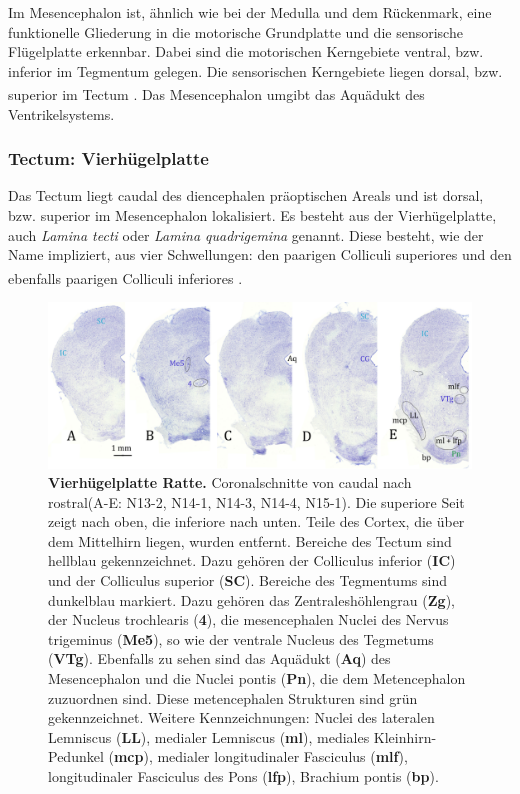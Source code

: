 \documentclass[12pt,a4paper,pdftex]{article}
\begin{document}
Im Mesencephalon ist, ähnlich wie bei der Medulla und dem Rückenmark, eine funktionelle Gliederung in die motorische Grundplatte und die sensorische Flügelplatte erkennbar. Dabei sind die motorischen Kerngebiete ventral, bzw. inferior im Tegmentum gelegen. Die sensorischen Kerngebiete liegen dorsal, bzw. superior im Tectum \textsuperscript{\cite[6]{trepel2011neuroanatomie}}. Das Mesencephalon umgibt das Aquädukt des Ventrikelsystems.

\subsubsection{Tectum: Vierhügelplatte}
 

Das Tectum liegt caudal des diencephalen präoptischen Areals und ist dorsal, bzw. superior im Mesencephalon lokalisiert. Es besteht aus der Vierhügelplatte, auch \textit{Lamina tecti} oder \textit{Lamina quadrigemina} genannt. Diese besteht, wie der Name impliziert, aus vier Schwellungen: den paarigen Colliculi superiores und den ebenfalls paarigen Colliculi inferiores \textsuperscript{\cite[6]{trepel2011neuroanatomie}}.

\begin{figure}[H]
    \centering
    \includegraphics[width=\textwidth]{pictures/Bilder_Jule/Ratte/SC_IC.png}
    \caption[Vierhügelplatte Ratte]{\textbf{Vierhügelplatte Ratte.} Coronalschnitte von caudal nach rostral(A-E: N13-2, N14-1, N14-3, N14-4, N15-1). Die superiore Seit zeigt nach oben, die inferiore nach unten. Teile des Cortex, die über dem Mittelhirn liegen, wurden entfernt. Bereiche des Tectum sind hellblau gekennzeichnet. Dazu gehören der Colliculus inferior (\textbf{IC}) und der Colliculus superior (\textbf{SC}). Bereiche des Tegmentums sind dunkelblau markiert. Dazu gehören das Zentraleshöhlengrau (\textbf{Zg}), der Nucleus trochlearis (\textbf{4}), die mesencephalen Nuclei des Nervus trigeminus (\textbf{Me5}), so wie der ventrale Nucleus des Tegmetums (\textbf{VTg}). Ebenfalls zu sehen sind das Aquädukt (\textbf{Aq}) des Mesencephalon und die Nuclei pontis (\textbf{Pn}), die dem Metencephalon zuzuordnen sind. Diese metencephalen Strukturen sind grün gekennzeichnet. Weitere Kennzeichnungen: Nuclei des lateralen Lemniscus (\textbf{LL}), medialer Lemniscus (\textbf{ml}), mediales Kleinhirn-Pedunkel (\textbf{mcp}), medialer longitudinaler Fasciculus (\textbf{mlf}), longitudinaler Fasciculus des Pons (\textbf{lfp}), Brachium pontis (\textbf{bp}).  }
    \label{fig:vierhuegelplatte_ratte}
\end{figure}{}
\end{document}
